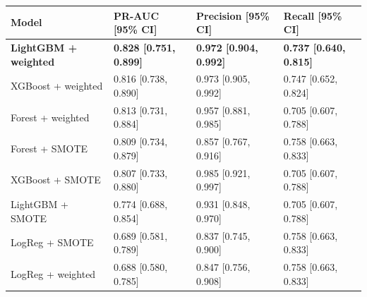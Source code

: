 \begin{tabular}{l l l l}
\hline
\textbf{Model} & \textbf{PR-AUC [95\% CI]} & \textbf{Precision [95\% CI]} & \textbf{Recall [95\% CI]} \\
\hline
\textbf{LightGBM + weighted} & \textbf{0.828 [0.751, 0.899]} & \textbf{0.972 [0.904, 0.992]} & \textbf{0.737 [0.640, 0.815]} \\
XGBoost + weighted & 0.816 [0.738, 0.890] & 0.973 [0.905, 0.992] & 0.747 [0.652, 0.824] \\
Forest + weighted & 0.813 [0.731, 0.884] & 0.957 [0.881, 0.985] & 0.705 [0.607, 0.788] \\
Forest + SMOTE & 0.809 [0.734, 0.879] & 0.857 [0.767, 0.916] & 0.758 [0.663, 0.833] \\
XGBoost + SMOTE & 0.807 [0.733, 0.880] & 0.985 [0.921, 0.997] & 0.705 [0.607, 0.788] \\
LightGBM + SMOTE & 0.774 [0.688, 0.854] & 0.931 [0.848, 0.970] & 0.705 [0.607, 0.788] \\
LogReg + SMOTE & 0.689 [0.581, 0.789] & 0.837 [0.745, 0.900] & 0.758 [0.663, 0.833] \\
LogReg + weighted & 0.688 [0.580, 0.785] & 0.847 [0.756, 0.908] & 0.758 [0.663, 0.833] \\
\hline
\end{tabular}